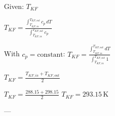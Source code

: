 Given: \( T_{KF} \)  

\( T_{KF} = \frac{\int_{T_{KF,in}}^{T_{KF,out}} c_p \, dT}{\int_{T_{KF,in}}^{T_{KF,out}} c_p} \)  

With \( c_p = \text{constant} \):  
\( T_{KF} = \frac{\int_{T_{KF,in}}^{T_{KF,out}} dT}{\int_{T_{KF,in}}^{T_{KF,out}} 1} \)  

\( T_{KF} = \frac{T_{KF,in} + T_{KF,out}}{2} \)  

\( T_{KF} = \frac{288.15 + 298.15}{2} \)  
\( T_{KF} = 293.15 \, \text{K} \)  

---